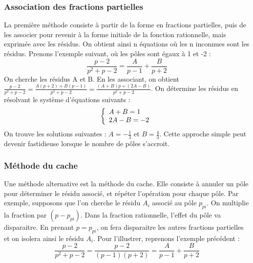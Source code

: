 	\subsubsection{Association des fractions partielles}
	La première méthode consiste à partir de la forme en fractions partielles, puis de les associer pour revenir à la forme initiale de la fonction rationnelle, mais exprimée avec les résidus. On obtient ainsi n équations où les n inconnues sont les résidus. Prenons l'exemple suivant, où les pôles sont égaux à 1 et -2 :
	\begin{equation*}
	\frac{p-2}{p^{2}+p-2}=\frac{A}{p-1}+\frac{B}{p+2}
	\end{equation*}
	On cherche les résidus A et B. En les associant, on obtient $\frac{p-2}{p^{2}+p-2}=\frac{A(p+2)+B(p-1)}{p^{2}+p-2}=\frac{(A+B)p+(2A-B)}{p^{2}+p-2}$. On détermine les résidus en résolvant le système d'équations suivants :
	\begin{equation*}
	\left \{
	\begin{array}{l l}
	A+B=1 \\
	2A-B=-2 \\
	\end{array}
	\right .
	\end{equation*}
	On trouve les solutions suivantes : $A=-\frac{1}{3}$ et $B=\frac{4}{3}$. Cette approche simple peut devenir fastidieuse lorsque le nombre de pôles s'accroit. 
	
	\subsubsection{Méthode du cache}
	
	Une méthode alternative est la méthode du cache. Elle consiste à annuler un pôle pour déterminer le résidu associé, et répéter l'opération pour chaque pôle. Par exemple, supposons que l'on cherche le résidu $A_{i}$ associé au pôle $p_{pi}$. On multiplie la fraction par $(p-p_{pi})$. Dans la fraction rationnelle, l'effet du pôle va disparaitre. En prenant $p=p_{pi}$, on fera disparaitre les autres fractions partielles et on isolera ainsi le résidu $A_{i}$. Pour l'illustrer, reprenons l'exemple précédent :
	\begin{equation*}
	\frac{p-2}{p^{2}+p-2}=\frac{p-2}{(p-1)(p+2)}=\frac{A}{p-1}+\frac{B}{p+2}
	\end{equation*}
		
